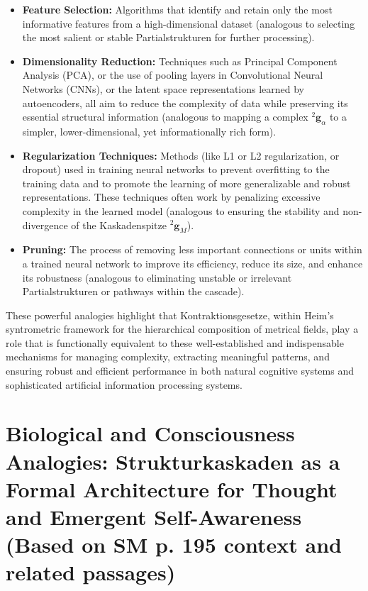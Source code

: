 \documentclass[
    12pt,              %
    a4paper,           %
    headings=normal,   %
    twoside=true,      %
    BCOR=8mm,          %
]{scrbook}
\newcommand{\kompositionsfeld}{{}^2\mathbf{g}}
\begin{document}
\begin{itemize}
        \begin{itemize}
            \item   \textbf{Feature Selection:} Algorithms that identify and retain only the most informative features from a high-dimensional dataset (analogous to selecting the most salient or stable Partialstrukturen for further processing).
            \item   \textbf{Dimensionality Reduction:} Techniques such as Principal Component Analysis (PCA), or the use of pooling layers in Convolutional Neural Networks (CNNs), or the latent space representations learned by autoencoders, all aim to reduce the complexity of data while preserving its essential structural information (analogous to mapping a complex \(\kompositionsfeld_\alpha\) to a simpler, lower-dimensional, yet informationally rich form).
            \item   \textbf{Regularization Techniques:} Methods (like L1 or L2 regularization, or dropout) used in training neural networks to prevent overfitting to the training data and to promote the learning of more generalizable and robust representations. These techniques often work by penalizing excessive complexity in the learned model (analogous to ensuring the stability and non-divergence of the Kaskadenspitze \(\kompositionsfeld_M\)).
            \item   \textbf{Pruning:} The process of removing less important connections or units within a trained neural network to improve its efficiency, reduce its size, and enhance its robustness (analogous to eliminating unstable or irrelevant Partialstrukturen or pathways within the cascade).
        \end{itemize}
\end{itemize}
These powerful analogies highlight that Kontraktionsgesetze, within Heim’s syntrometric framework for the hierarchical composition of metrical fields, play a role that is functionally equivalent to these well-established and indispensable mechanisms for managing complexity, extracting meaningful patterns, and ensuring robust and efficient performance in both natural cognitive systems and sophisticated artificial information processing systems.

\section{Biological and Consciousness Analogies: Strukturkaskaden as a Formal Architecture for Thought and Emergent Self-Awareness (Based on SM p. 195 context and related passages)}
\label{sec:ch9_4_biological_consciousness_analogies}
\end{document}
